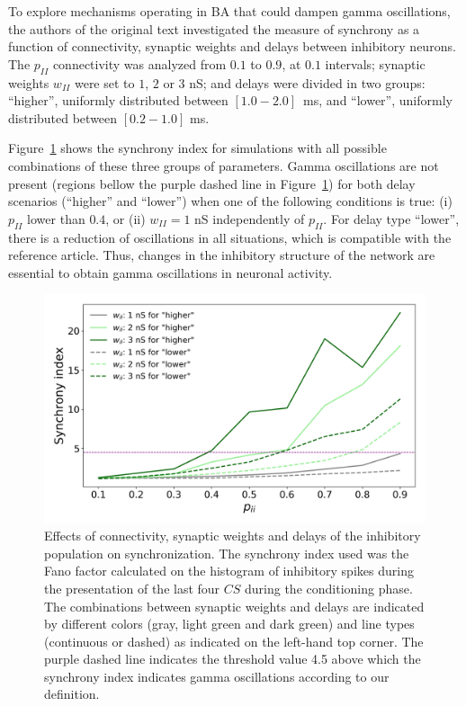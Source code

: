 To explore mechanisms operating in BA that could dampen gamma oscillations, the authors of the original text investigated the measure of synchrony as a function of connectivity, synaptic weights and delays between inhibitory neurons. The $p_{II}$ connectivity was analyzed from $0.1$ to $0.9$, at $0.1$ intervals; synaptic weights $w_{II}$ were set to $1$, $2$ or $3$ nS; and delays were divided in two groups: ``higher'', uniformly distributed between $[1.0-2.0]$~ms, and ``lower'', uniformly distributed between $[0.2-1.0]$ ms. 

Figure~\ref{fig:synchrony} shows the synchrony index for simulations with all possible combinations of these three groups of parameters. Gamma oscillations are not present (regions bellow the purple dashed line in Figure~\ref{fig:synchrony}) for both delay scenarios (``higher'' and ``lower'') when one of the following conditions is true: (i) $p_{II}$ lower than $0.4$, or (ii) $w_{II} = 1$ nS independently of $p_{II}$. For delay type ``lower'', there is a reduction of oscillations in all situations, which is compatible with the reference article. Thus, changes in the inhibitory structure of the network are essential to obtain gamma oscillations in neuronal activity.

\begin{figure}[!ht]
\centering
\includegraphics[width=1.0\textwidth]{figures/synchrony_index.png}
\caption{\label{fig:synchrony} Effects of connectivity, synaptic weights and delays of the inhibitory population on synchronization. The synchrony index used was the Fano factor calculated on the histogram of inhibitory spikes during the presentation of the last four $CS$ during the conditioning phase. The combinations between synaptic weights and delays are indicated by different colors (gray, light green and dark green) and line types (continuous or dashed) as indicated on the left-hand top corner. The purple dashed line indicates the threshold value 4.5 above which the synchrony index indicates gamma oscillations according to our definition.}
\end{figure}
\FloatBarrier


